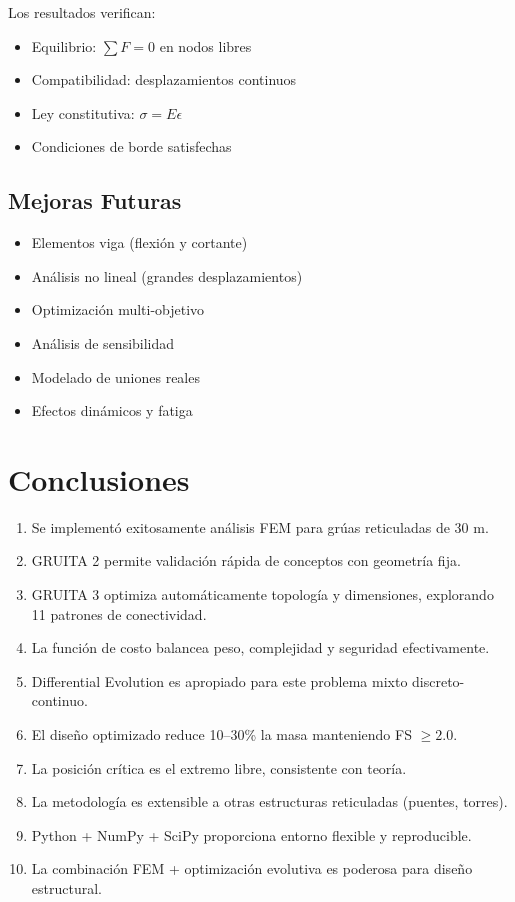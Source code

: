 \documentclass[10pt,a4paper]{article}
\begin{document}
Los resultados verifican:
\begin{itemize}
\item Equilibrio: $\sum F = 0$ en nodos libres
\item Compatibilidad: desplazamientos continuos
\item Ley constitutiva: $\sigma = E\epsilon$
\item Condiciones de borde satisfechas
\end{itemize}

\subsection{Mejoras Futuras}

\begin{itemize}
\item Elementos viga (flexión y cortante)
\item Análisis no lineal (grandes desplazamientos)
\item Optimización multi-objetivo
\item Análisis de sensibilidad
\item Modelado de uniones reales
\item Efectos dinámicos y fatiga
\end{itemize}

\section{Conclusiones}

\begin{enumerate}
\item Se implementó exitosamente análisis FEM para grúas reticuladas de 30 m.

\item GRUITA 2 permite validación rápida de conceptos con geometría fija.

\item GRUITA 3 optimiza automáticamente topología y dimensiones, explorando 11 patrones de conectividad.

\item La función de costo balancea peso, complejidad y seguridad efectivamente.

\item Differential Evolution es apropiado para este problema mixto discreto-continuo.

\item El diseño optimizado reduce 10--30\% la masa manteniendo FS $\geq 2.0$.

\item La posición crítica es el extremo libre, consistente con teoría.

\item La metodología es extensible a otras estructuras reticuladas (puentes, torres).

\item Python + NumPy + SciPy proporciona entorno flexible y reproducible.

\item La combinación FEM + optimización evolutiva es poderosa para diseño estructural.
\end{enumerate}
\end{document}
